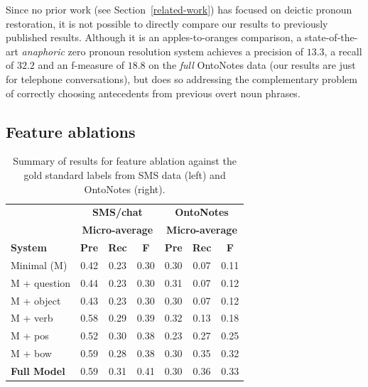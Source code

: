 \documentclass[11pt]{report}
\begin{document}
Since no prior work (see Section~\ref{related-work}) has focused on deictic pronoun restoration, it is not possible to directly compare our results to previously published results. Although it is an apples-to-oranges comparison, a state-of-the-art \emph{anaphoric} zero pronoun resolution system \cite{chenchinese} achieves a precision of $13.3$, a recall of $32.2$ and an f-measure of $18.8$ on the \emph{full} OntoNotes data (our results are just for telephone conversations), but does so addressing the complementary problem of correctly choosing antecedents from previous overt noun phrases.

\subsection{Feature ablations} \label{ablation}

\begin{table}[t]
\begin{footnotesize}
\begin{center}
\begin{tabular}{|l|c|c|c|c|c|c|}
\hline
                         & \multicolumn{3}{c|}{\bf SMS/chat}                          & \multicolumn{3}{c|}{\bf OntoNotes} \\
                         & \multicolumn{3}{c|}{\bf Micro-average}                          & \multicolumn{3}{c|}{\bf Micro-average} \\
\bf System               & \bf Pre & \bf Rec & \bf F &\bf Pre & \bf Rec & \bf F \\
\hline
    Minimal (M)       & 0.42 	& 0.23 	& 0.30    & 0.30 	& 0.07 	& 0.11    \\
    M +  question 	& 0.44 & 0.23 & 0.30     & 0.31 & 0.07 & 0.12   \\
    M + object		& 0.43 & 0.23 & 0.30   & 0.30 & 0.07 & 0.12  \\
    M +  verb	           & 0.58 & 0.29 & 0.39    & 0.32 & 0.13 & 0.18    \\
    M + pos 		  & 0.52 & 0.30 & 0.38   & 0.23 & 0.27 & 0.25  \\
    M + bow		& 0.59 & 0.28 & 0.38 & 0.30 & 0.35 & 0.32  \\
    \bf Full Model           & 0.59    & 0.31    & 0.41    & 0.30    & 0.36    & 0.33    \\
\hline
\end{tabular}
\end{center}
\end{footnotesize}
\caption{\label{feature-ablation} Summary of results for feature ablation against the gold standard labels from SMS data (left) and OntoNotes (right).}
\end{table}
\end{document}
